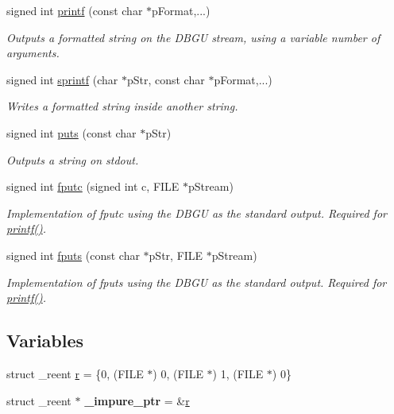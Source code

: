 \begin{DoxyCompactItemize}
signed int \hyperlink{group__printf_gad6c265f6d41266cbb62035915f9c0030}{printf} (const char $\ast$p\+Format,...)
\begin{DoxyCompactList}\small\item\em Outputs a formatted string on the D\+B\+G\+U stream, using a variable number of arguments. \end{DoxyCompactList}\item 
signed int \hyperlink{group__printf_ga2ab9fb00bf66223b1a3f334376963100}{sprintf} (char $\ast$p\+Str, const char $\ast$p\+Format,...)
\begin{DoxyCompactList}\small\item\em Writes a formatted string inside another string. \end{DoxyCompactList}\item 
signed int \hyperlink{group__printf_ga5a8c5f197e584138be351a4437f67689}{puts} (const char $\ast$p\+Str)
\begin{DoxyCompactList}\small\item\em Outputs a string on stdout. \end{DoxyCompactList}\item 
signed int \hyperlink{group__printf_ga25c4b74226a8a3a0d6eef3a072be087b}{fputc} (signed int c, F\+I\+L\+E $\ast$p\+Stream)
\begin{DoxyCompactList}\small\item\em Implementation of fputc using the D\+B\+G\+U as the standard output. Required for \hyperlink{group__printf_gad6c265f6d41266cbb62035915f9c0030}{printf()}. \end{DoxyCompactList}\item 
signed int \hyperlink{group__printf_gad870e26ae50d712bb504aa4b067802f4}{fputs} (const char $\ast$p\+Str, F\+I\+L\+E $\ast$p\+Stream)
\begin{DoxyCompactList}\small\item\em Implementation of fputs using the D\+B\+G\+U as the standard output. Required for \hyperlink{group__printf_gad6c265f6d41266cbb62035915f9c0030}{printf()}. \end{DoxyCompactList}\end{DoxyCompactItemize}
\subsection*{Variables}
\begin{DoxyCompactItemize}
\item 
struct \+\_\+reent \hyperlink{group__printf_ga933442104e916763ad534cd32e42bbae}{r} = \{0, (F\+I\+L\+E $\ast$) 0, (F\+I\+L\+E $\ast$) 1, (F\+I\+L\+E $\ast$) 0\}
\item 
\hypertarget{group__printf_ga961919482965d7c4c2c243439dd036df}{}struct \+\_\+reent $\ast$ {\bfseries \+\_\+impure\+\_\+ptr} = \&\hyperlink{group__printf_ga933442104e916763ad534cd32e42bbae}{r}\label{group__printf_ga961919482965d7c4c2c243439dd036df}

\end{DoxyCompactItemize}


